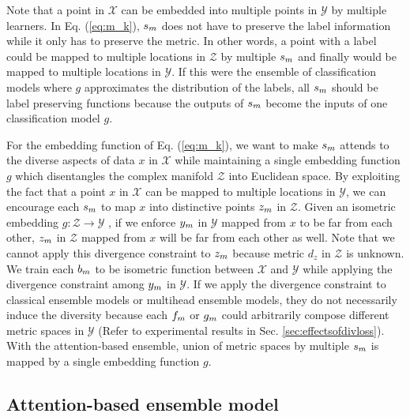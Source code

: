 \documentclass[runningheads]{llncs}
\begin{document}
Note that a point in $\mathcal{X} $ can be embedded into multiple points in $\mathcal{Y}$ by multiple learners.
In Eq. (\ref{eq:m_k}), $s_m$ does not have to preserve the label information while it only has to preserve the metric.
In other words, a point with a label could be mapped to multiple locations in $\mathcal{Z}$ by multiple $s_m$ and
 finally would be mapped to multiple locations in $\mathcal{Y}$.
If this were the ensemble of classification models where $g$ approximates the distribution of the labels,
 all $s_m$ should be label preserving functions because the outputs of $s_m$
 become the inputs of one classification model $g$.

For the embedding function of Eq. (\ref{eq:m_k}), we want to make $s_m$ attends to the diverse aspects of data $x$ in $\mathcal{X}$
 while maintaining a single embedding function $g$ which disentangles the complex manifold $\mathcal{Z}$ into Euclidean space.
By exploiting the fact that a point $x$ in $\mathcal{X}$ can be mapped to multiple locations in $\mathcal{Y}$,
 we can encourage each $s_m$ to map $x$ into distinctive points $z_m$ in $\mathcal{Z}$.
Given an isometric embedding $g:\mathcal{Z} \rightarrow \mathcal{Y}$ ,
 if we enforce $y_m$ in $\mathcal{Y}$ mapped from $x$ to be far from each other,
 $z_m$ in $\mathcal{Z}$ mapped from $x$ will be far from each other as well.
Note that we cannot apply this divergence constraint to $z_m$ because metric $d_z$ in $\mathcal{Z}$ is unknown.
 We train each $b_m $ to be isometric function between $\mathcal{X} $ and $\mathcal{Y}$
 while applying the divergence constraint among $y_m$ in $\mathcal{Y}$.
If we apply the divergence constraint to classical ensemble models or multihead ensemble models,
 they do not necessarily induce the diversity because each $f_m $ or $g_m$ could
 arbitrarily compose different metric spaces in $\mathcal{Y}$ (Refer to experimental results in Sec. \ref{sec:effectsofdivloss}).
With the attention-based ensemble, union of metric spaces by multiple $s_m $ is mapped by a single embedding function $g$.

\vspace{-4mm}
\subsection{Attention-based ensemble model}
\label{sec:model}
\vspace{-2mm}
\end{document}
